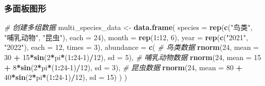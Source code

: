 \documentclass[
  twoside]{book}
\newenvironment{Shaded}{\begin{snugshade}}{\end{snugshade}}
\newcommand{\AttributeTok}[1]{\textcolor[rgb]{0.13,0.29,0.53}{#1}}
\newcommand{\CommentTok}[1]{\textcolor[rgb]{0.56,0.35,0.01}{\textit{#1}}}
\newcommand{\DecValTok}[1]{\textcolor[rgb]{0.00,0.00,0.81}{#1}}
\newcommand{\FunctionTok}[1]{\textcolor[rgb]{0.13,0.29,0.53}{\textbf{#1}}}
\newcommand{\NormalTok}[1]{#1}
\newcommand{\OtherTok}[1]{\textcolor[rgb]{0.56,0.35,0.01}{#1}}
\newcommand{\SpecialCharTok}[1]{\textcolor[rgb]{0.81,0.36,0.00}{\textbf{#1}}}
\newcommand{\StringTok}[1]{\textcolor[rgb]{0.31,0.60,0.02}{#1}}
\begin{document}
\hypertarget{ux591aux9762ux677fux56feux5f62}{%
\subsubsection{多面板图形}\label{ux591aux9762ux677fux56feux5f62}}

\begin{Shaded}
\begin{Highlighting}[]
\CommentTok{\# 创建多组数据}
\NormalTok{multi\_species\_data }\OtherTok{\textless{}{-}} \FunctionTok{data.frame}\NormalTok{(}
  \AttributeTok{species =} \FunctionTok{rep}\NormalTok{(}\FunctionTok{c}\NormalTok{(}\StringTok{"鸟类"}\NormalTok{, }\StringTok{"哺乳动物"}\NormalTok{, }\StringTok{"昆虫"}\NormalTok{), }\AttributeTok{each =} \DecValTok{24}\NormalTok{),}
  \AttributeTok{month =} \FunctionTok{rep}\NormalTok{(}\DecValTok{1}\SpecialCharTok{:}\DecValTok{12}\NormalTok{, }\DecValTok{6}\NormalTok{),}
  \AttributeTok{year =} \FunctionTok{rep}\NormalTok{(}\FunctionTok{c}\NormalTok{(}\StringTok{"2021"}\NormalTok{, }\StringTok{"2022"}\NormalTok{), }\AttributeTok{each =} \DecValTok{12}\NormalTok{, }\AttributeTok{times =} \DecValTok{3}\NormalTok{),}
  \AttributeTok{abundance =} \FunctionTok{c}\NormalTok{(}
    \CommentTok{\# 鸟类数据}
    \FunctionTok{rnorm}\NormalTok{(}\DecValTok{24}\NormalTok{, }\AttributeTok{mean =} \DecValTok{30} \SpecialCharTok{+} \DecValTok{15}\SpecialCharTok{*}\FunctionTok{sin}\NormalTok{(}\DecValTok{2}\SpecialCharTok{*}\NormalTok{pi}\SpecialCharTok{*}\NormalTok{(}\DecValTok{1}\SpecialCharTok{:}\DecValTok{24{-}1}\NormalTok{)}\SpecialCharTok{/}\DecValTok{12}\NormalTok{), }\AttributeTok{sd =} \DecValTok{5}\NormalTok{),}
    \CommentTok{\# 哺乳动物数据}
    \FunctionTok{rnorm}\NormalTok{(}\DecValTok{24}\NormalTok{, }\AttributeTok{mean =} \DecValTok{15} \SpecialCharTok{+} \DecValTok{8}\SpecialCharTok{*}\FunctionTok{sin}\NormalTok{(}\DecValTok{2}\SpecialCharTok{*}\NormalTok{pi}\SpecialCharTok{*}\NormalTok{(}\DecValTok{1}\SpecialCharTok{:}\DecValTok{24{-}1}\NormalTok{)}\SpecialCharTok{/}\DecValTok{12}\NormalTok{), }\AttributeTok{sd =} \DecValTok{3}\NormalTok{),}
    \CommentTok{\# 昆虫数据}
    \FunctionTok{rnorm}\NormalTok{(}\DecValTok{24}\NormalTok{, }\AttributeTok{mean =} \DecValTok{80} \SpecialCharTok{+} \DecValTok{40}\SpecialCharTok{*}\FunctionTok{sin}\NormalTok{(}\DecValTok{2}\SpecialCharTok{*}\NormalTok{pi}\SpecialCharTok{*}\NormalTok{(}\DecValTok{1}\SpecialCharTok{:}\DecValTok{24{-}1}\NormalTok{)}\SpecialCharTok{/}\DecValTok{12}\NormalTok{), }\AttributeTok{sd =} \DecValTok{15}\NormalTok{)}
\NormalTok{  )}
\NormalTok{)}


\end{Highlighting}
\end{Shaded}
\end{document}
